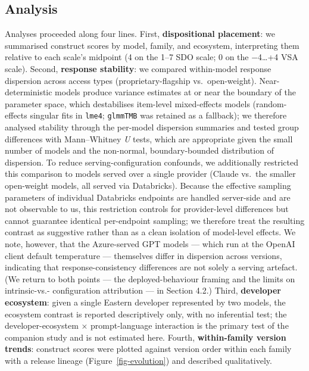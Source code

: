 \documentclass[
]{article}
\begin{document}
\subsection{Analysis}\label{analysis}

Analyses proceeded along four lines. First, \textbf{dispositional
placement}: we summarised construct scores by model, family, and
ecosystem, interpreting them relative to each scale's midpoint (4 on the
1--7 SDO scale; 0 on the −4\ldots+4 VSA scale). Second, \textbf{response
stability}: we compared within-model response dispersion across access
types (proprietary-flagship vs.~open-weight). Near- deterministic models
produce variance estimates at or near the boundary of the parameter
space, which destabilises item-level mixed-effects models
(random-effects singular fits in \texttt{lme4}; \texttt{glmmTMB} was
retained as a fallback); we therefore analysed stability through the
per-model dispersion summaries and tested group differences with
Mann--Whitney \emph{U} tests, which are appropriate given the small
number of models and the non-normal, boundary-bounded distribution of
dispersion. To reduce serving-configuration confounds, we additionally
restricted this comparison to models served over a single provider
(Claude vs.~the smaller open-weight models, all served via Databricks).
Because the effective sampling parameters of individual Databricks
endpoints are handled server-side and are not observable to us, this
restriction controls for provider-level differences but cannot guarantee
identical per-endpoint sampling; we therefore treat the resulting
contrast as suggestive rather than as a clean isolation of model-level
effects. We note, however, that the Azure-served GPT models --- which
run at the OpenAI client default temperature --- themselves differ in
dispersion across versions, indicating that response-consistency
differences are not solely a serving artefact. (We return to both points
--- the deployed-behaviour framing and the limits on intrinsic-vs.-
configuration attribution --- in Section 4.2.) Third, \textbf{developer
ecosystem}: given a single Eastern developer represented by two models,
the ecosystem contrast is reported descriptively only, with no
inferential test; the developer-ecosystem × prompt-language interaction
is the primary test of the companion study and is not estimated here.
Fourth, \textbf{within-family version trends}: construct scores were
plotted against version order within each family with a release lineage
(Figure~\ref{fig-evolution}) and described qualitatively.
\end{document}
